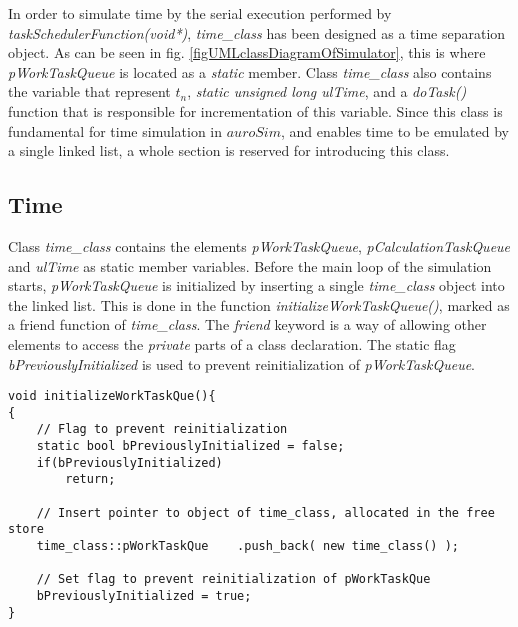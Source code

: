 			In order to simulate time by the serial execution performed by \emph{taskSchedulerFunction(void*)}, \emph{time\_class} has been designed as a time separation object.
			As can be seen in fig. \ref{figUMLclassDiagramOfSimulator}, this is where \emph{pWorkTaskQueue} is located as a \emph{static} member.
			Class \emph{time\_class} also contains the variable that represent $t_n$, \emph{static unsigned long ulTime}, and a \emph{doTask()} function that is responsible for incrementation of this variable.
			Since this class is fundamental for time simulation in $auroSim$, and enables time to be emulated by a single linked list, a whole section is reserved for introducing this class.


		\subsection{Time}
		\label{ssecTime}
			Class \emph{time\_class} contains the elements \emph{pWorkTaskQueue}, \emph{pCalculationTaskQueue} and \emph{ulTime} as static member variables.
			Before the main loop of the simulation starts, \emph{pWorkTaskQueue} is initialized by inserting a single \emph{time\_class} object into the linked list. %
			This is done in the function \emph{initializeWorkTaskQueue()}, marked as a friend function of \emph{time\_class}.
			The \emph{friend} keyword is a way of allowing other elements to access the \emph{private} parts of a class declaration\cite[Appendix C.11]{Stroustrup2000}. %
			The static flag \emph{bPreviouslyInitialized} is used to prevent reinitialization of \emph{pWorkTaskQueue}. 

\begin{lstlisting}
void initializeWorkTaskQue(){
{
	// Flag to prevent reinitialization
	static bool bPreviouslyInitialized = false;
	if(bPreviouslyInitialized)
		return;

	// Insert pointer to object of time_class, allocated in the free store	 
 	time_class::pWorkTaskQue 	.push_back( new time_class() );

	// Set flag to prevent reinitialization of pWorkTaskQue
	bPreviouslyInitialized = true;
}
\end{lstlisting}
			
